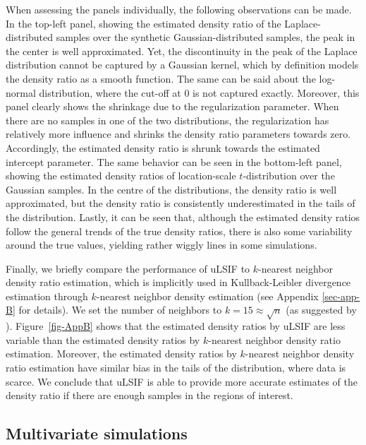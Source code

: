 \documentclass[
]{article}
\begin{document}
When assessing the panels individually, the following observations can
be made. In the top-left panel, showing the estimated density ratio of
the Laplace-distributed samples over the synthetic Gaussian-distributed
samples, the peak in the center is well approximated. Yet, the
discontinuity in the peak of the Laplace distribution cannot be captured
by a Gaussian kernel, which by definition models the density ratio as a
smooth function. The same can be said about the log-normal distribution,
where the cut-off at \(0\) is not captured exactly. Moreover, this panel
clearly shows the shrinkage due to the regularization parameter. When
there are no samples in one of the two distributions, the regularization
has relatively more influence and shrinks the density ratio parameters
towards zero. Accordingly, the estimated density ratio is shrunk towards
the estimated intercept parameter. The same behavior can be seen in the
bottom-left panel, showing the estimated density ratios of
location-scale \(t\)-distribution over the Gaussian samples. In the
centre of the distributions, the density ratio is well approximated, but
the density ratio is consistently underestimated in the tails of the
distribution. Lastly, it can be seen that, although the estimated
density ratios follow the general trends of the true density ratios,
there is also some variability around the true values, yielding rather
wiggly lines in some simulations.

Finally, we briefly compare the performance of uLSIF to \(k\)-nearest
neighbor density ratio estimation, which is implicitly used in
Kullback-Leibler divergence estimation through \(k\)-nearest neighbor
density estimation (see Appendix \ref{sec-app-B} for details). We set
the number of neighbors to \(k = 15 \approx \sqrt n\) (as suggested by
). Figure~\ref{fig-AppB} shows that the estimated
density ratios by uLSIF are less variable than the estimated density
ratios by \(k\)-nearest neighbor density ratio estimation. Moreover, the
estimated density ratios by \(k\)-nearest neighbor density ratio
estimation have similar bias in the tails of the distribution, where
data is scarce. We conclude that uLSIF is able to provide more accurate
estimates of the density ratio if there are enough samples in the
regions of interest.

\subsection{Multivariate simulations}\label{multivariate-simulations}
\end{document}
